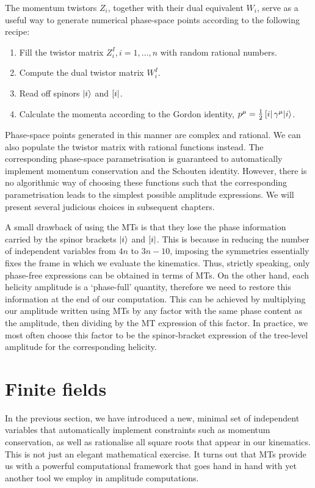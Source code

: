 \documentclass[main.tex]{subfiles}
\begin{document}
The momentum twistors $Z_i$, together with their dual equivalent $W_i$, serve as a useful way to generate numerical phase-space points according to the following recipe:
\begin{enumerate}
    \item Fill the twistor matrix $Z_i^I, i=1, \ldots, n$ with random rational numbers.
    \item Compute the dual twistor matrix $W_i^I$.
    \item Read off spinors $|i \rangle$ and $\left[ i \right|$.
    \item Calculate the momenta according to the Gordon identity, $p^\mu = \frac{1}{2}\left[ i \right|\gamma^\mu |i\rangle$.
\end{enumerate}
Phase-space points generated in this manner are complex and rational. We can also populate the twistor matrix with rational functions instead. The corresponding phase-space parametrisation is guaranteed to automatically implement momentum conservation and the Schouten identity. However, there is no algorithmic way of choosing these functions such that the corresponding parametrisation leads to the simplest possible amplitude expressions. We will present several judicious choices in subsequent chapters.

A small drawback of using the MTs is that they lose the phase information carried by the spinor brackets $|i \rangle$ and $\left[ i \right|$. This is because in reducing the number of independent variables from $4n$ to $3n-10$, imposing the symmetries essentially fixes the frame in which we evaluate the kinematics. Thus, strictly speaking, only phase-free expressions can be obtained in terms of MTs. On the other hand, each helicity amplitude is a `phase-full' quantity, therefore we need to restore this information at the end of our computation. This can be achieved by multiplying our amplitude written using MTs by any factor with the same phase content as the amplitude, then dividing by the MT expression of this factor. In practice, we most often choose this factor to be the spinor-bracket expression of the tree-level amplitude for the corresponding helicity.
\section{Finite fields} \label{sec:FF}
In the previous section, we have introduced a new, minimal set of independent variables that automatically implement constraints such as momentum conservation, as well as rationalise all square roots that appear in our kinematics. This is not just an elegant mathematical exercise. It turns out that MTs provide us with a powerful computational framework that goes hand in hand with yet another tool we employ in amplitude computations.
\end{document}
